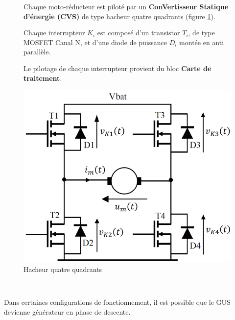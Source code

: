 \begin{figure}[ht!]
\begin{minipage}{0.6\linewidth}
Chaque moto-réducteur est piloté par un \textbf{ConVertisseur Statique d'énergie (CVS)} de type hacheur quatre quadrants (figure \ref{fig05}).

Chaque interrupteur $K_i$ est composé d'un transistor $T_i$, de type MOSFET Canal N, et d'une diode de puissance $D_i$ montée en anti parallèle.

Le pilotage de chaque interrupteur provient du bloc \textbf{Carte de traitement}.
\end{minipage}
\hfill
\begin{minipage}{0.35\linewidth}
\centering\includegraphics[width=0.8\linewidth]{img/fig05}
\caption{\label{fig05}Hacheur quatre quadrants}
\end{minipage}
\end{figure}


~\

Dans certaines configurations de fonctionnement, il est possible que le GUS devienne générateur en phase de descente.


